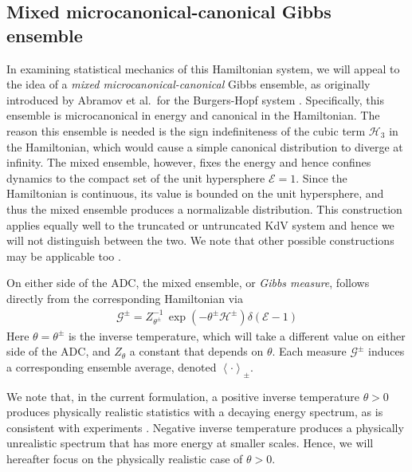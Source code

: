 \documentclass[11pt]{article}
\newcommand{\mean}[1]{\left< #1 \right>}
\newcommand{\En}{\mathcal{E}}
\newcommand{\Ham}{\mathcal{H}}
\newcommand{\Hupdn}{\Ham^{\pm}}
\newcommand{\Hthree}{\Ham_{3}}
\newcommand{\Gibbs}{\mathcal{G}}
\newcommand{\Gupdn}{\Gibbs^{\pm}}
\newcommand{\thupdn}{\theta^{\pm}}
\begin{document}
\subsection{Mixed microcanonical-canonical Gibbs ensemble}

	In examining statistical mechanics of this Hamiltonian system, we will appeal to the idea of a {\em mixed microcanonical-canonical} Gibbs ensemble, as originally introduced by Abramov et al.~for the Burgers-Hopf system \cite{abramov2003}. Specifically, this ensemble is microcanonical in energy and canonical in the Hamiltonian. The reason this ensemble is needed is the sign indefiniteness of the cubic term $\Hthree$ in the Hamiltonian, which would cause a simple canonical distribution to diverge at infinity. The mixed ensemble, however, fixes the energy and hence confines dynamics to the compact set of the unit hypersphere $\En = 1$. Since the Hamiltonian is continuous, its value is bounded on the unit hypersphere, and thus the mixed ensemble produces a normalizable distribution. This construction applies equally well to the truncated or untruncated KdV system and hence we will not distinguish between the two. We note that other possible constructions may be applicable too \cite{kleeman2014nonequilibrium}.
	
	On either side of the ADC, the mixed ensemble, or {\em Gibbs measure}, follows directly from the corresponding Hamiltonian via
\begin{align}
\label{Gibbs}
\Gupdn = Z_{\thupdn}^{-1} \, \exp(-\thupdn \Hupdn) \delta(\En - 1)
\end{align}
Here $\theta = \thupdn$ is the inverse temperature, which will take a different value on either side of the ADC, and $Z_{\theta}$ a constant that depends on $\theta$. Each measure $\Gupdn$ induces a corresponding ensemble average, denoted $\mean{\cdot}_{\pm}$. 

	We note that, in the current formulation, a positive inverse temperature $\theta > 0$ produces physically realistic statistics with a decaying energy spectrum, as is consistent with experiments \cite{majda2019, bajars2013weakly}. Negative inverse temperature produces a physically unrealistic spectrum that has more energy at smaller scales. Hence, we will hereafter focus on the physically realistic case of $\theta > 0$.
\end{document}
